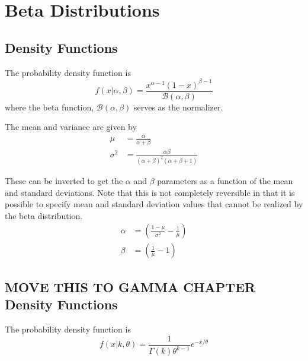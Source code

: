 \documentclass[../../main.tex]{subfiles}
\begin{document}
\chapter{Beta Distributions}

\section{Density Functions}
The probability density function is
\[
    f\left(x| \alpha, \beta \right) =
    \frac{
        x^{\alpha-1} (1 - x)^{\beta-1}
    }
    {
        \mathcal{B}(\alpha, \beta)
    }
\]
where the beta function, $\mathcal{B}(\alpha, \beta)$ serves as the
normalizer.

The mean and variance are given by
\begin{align}
    \mu &= \frac{\alpha }{ \alpha + \beta} \\
    \sigma^2 &= \frac{\alpha \beta}{ (\alpha + \beta)^2 (\alpha + \beta + 1)} 
\end{align}

These can be inverted to get the $\alpha$ and $\beta$ parameters as a function
of the mean and standard deviations.  Note that this is not completely
reversible in that it is possible to specify mean and standard deviation
values that cannot be realized by the beta distribution.
\begin{align}
    \alpha &= \left( \frac{1-\mu}{\sigma^2} - \frac{1}{\mu} \right) \\
    \beta &= \left( \frac{1}{\mu}  - 1 \right)
\end{align}


\section{MOVE THIS TO GAMMA CHAPTER Density Functions}
The probability density function is
\begin{equation}
    f\left(x| k, \theta \right) =
    \frac{1}{\Gamma(k)\theta^{k - 1}}e^{-x / \theta}
\end{equation}
\end{document}
